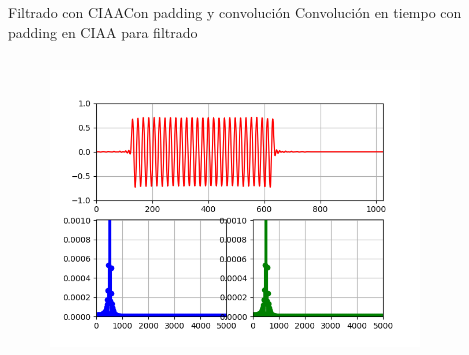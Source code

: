 \begin{frame}[t]{Filtrado con CIAA}{Con padding y convolución}
   \protoboardicon
   Convolución en tiempo con padding en CIAA para filtrado
   \begin{columns}[c]
      \hspace{5pt}
      \begin{column}{.3\textwidth}
         
      \end{column}
      \hspace{2pt}
      \vrule
      \hspace{2pt}
      \begin{column}{.3\textwidth}
         
      \end{column}
      \hspace{2pt}
      \vrule
      \hspace{2pt}
      \begin{column}{.4\textwidth}
         \includegraphics[width=0.8\textwidth]{5_clase/ciaa/psf1/conv1.png}
      \end{column}
      \hspace{2pt}
   \end{columns}
   \vfill
\end{frame}
